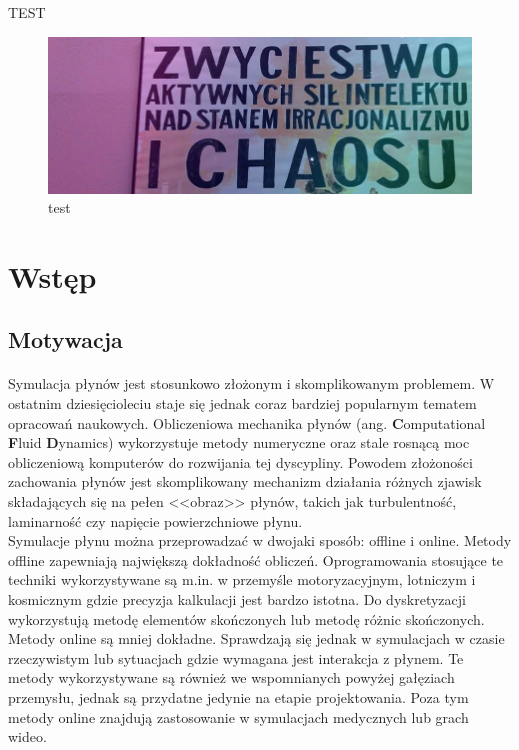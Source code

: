 
{\Large TEST} \\
\begin{figure}[h!]
\centering
\includegraphics[width=\textwidth]{chaos}
\caption{test}
\label{fig:test1}
\end{figure}



\newpage

\section{Wstęp}

\subsection{Motywacja}
\paragraph{}
Symulacja płynów jest stosunkowo złożonym i skomplikowanym problemem. W ostatnim dziesięcioleciu staje się jednak coraz bardziej popularnym tematem opracowań naukowych. Obliczeniowa mechanika płynów (ang. \textbf{C}omputational \textbf{F}luid \textbf{D}ynamics) wykorzystuje metody numeryczne oraz stale rosnącą moc obliczeniową komputerów do rozwijania tej dyscypliny. Powodem złożoności zachowania płynów jest skomplikowany mechanizm działania różnych zjawisk składających się na pełen <<obraz>> płynów, takich jak turbulentność, laminarność czy napięcie powierzchniowe płynu.\\
Symulacje płynu można przeprowadzać w dwojaki sposób: offline i online.
Metody offline zapewniają największą dokładność obliczeń. Oprogramowania stosujące te techniki wykorzystywane są m.in. w przemyśle motoryzacyjnym, lotniczym i kosmicznym gdzie precyzja kalkulacji jest bardzo istotna. Do dyskretyzacji wykorzystują metodę elementów skończonych lub metodę różnic skończonych.\\
Metody online są mniej dokładne. Sprawdzają się jednak w symulacjach w czasie rzeczywistym lub sytuacjach gdzie wymagana jest interakcja z płynem. Te metody wykorzystywane są również we wspomnianych powyżej gałęziach przemysłu, jednak są przydatne jedynie na etapie projektowania. Poza tym metody online znajdują zastosowanie w symulacjach medycznych lub grach wideo.
\par

